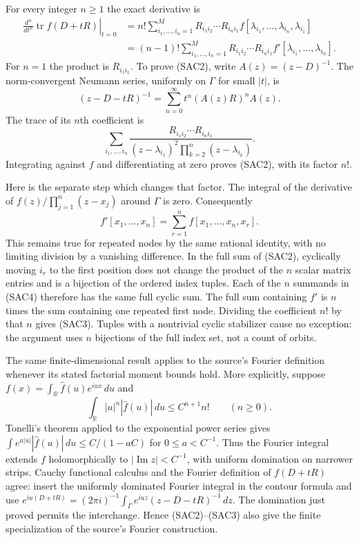 For every integer $n\geq1$ the exact derivative is
\begin{align}
 \left.\frac{d^n}{dt^n}\operatorname{tr}f(D+tR)\right|_{t=0}
 &=n!\sum_{i_1,\ldots,i_n=1}^{M}
       R_{i_1i_2}\cdots R_{i_ni_1}
       f[\lambda_{i_1},\ldots,\lambda_{i_n},\lambda_{i_1}]
       \tag{SAC2}\label{eq:SAC-repeated}\\
 &=(n-1)!\sum_{i_1,\ldots,i_n=1}^{M}
       R_{i_1i_2}\cdots R_{i_ni_1}
       f'[\lambda_{i_1},\ldots,\lambda_{i_n}].
       \tag{SAC3}\label{eq:SAC-cyclic}
\end{align}
For $n=1$ the product is $R_{i_1i_1}$. To prove (SAC2), write
$A(z)=(z-D)^{-1}$. The norm-convergent Neumann series, uniformly
on $\Gamma$ for small $|t|$, is
\[
 (z-D-tR)^{-1}
 =\sum_{n=0}^{\infty}t^n(A(z)R)^n A(z).
\]
The trace of its $n$th coefficient is
\[
 \sum_{i_1,\ldots,i_n}
 \frac{R_{i_1i_2}\cdots R_{i_ni_1}}
 {(z-\lambda_{i_1})^2
       \prod_{k=2}^n(z-\lambda_{i_k})}.
\]
Integrating against $f$ and differentiating at zero proves (SAC2),
with its factor $n!$.

Here is the separate step which changes that factor. The integral
of the derivative of $f(z)/\prod_{j=1}^{n}(z-x_j)$ around
$\Gamma$ is zero. Consequently
\begin{equation}\tag{SAC4}
 f'[x_1,\ldots,x_n]
 =\sum_{r=1}^{n} f[x_1,\ldots,x_n,x_r].
\end{equation}
This remains true for repeated nodes by the same rational identity,
with no limiting division by a vanishing difference. In the full
sum of (SAC2), cyclically moving $i_r$ to the first position does
not change the product of the $n$ scalar matrix entries and is a
bijection of the ordered index tuples. Each of the $n$ summands
in (SAC4) therefore has the same full cyclic sum. The full sum
containing $f'$ is $n$ times the sum containing one repeated first
node. Dividing the coefficient $n!$ by that $n$ gives (SAC3).
Tuples with a nontrivial cyclic stabilizer cause no exception:
the argument uses $n$ bijections of the full index set, not a
count of orbits.

The same finite-dimensional result applies to the source's
Fourier definition whenever its stated factorial moment bounds
hold. More explicitly, suppose
$f(x)=\int_{\mathbb R}\widehat f(u)e^{iux}\,du$ and
\[
 \int_{\mathbb R}|u|^n|\widehat f(u)|\,du
 \leq C^{n+1}n!\qquad(n\geq0).
\]
Tonelli's theorem applied to the exponential power series gives
$\int e^{a|u|}|\widehat f(u)|\,du\leq C/(1-aC)$ for
$0\leq a<C^{-1}$. Thus the Fourier integral extends $f$
holomorphically to $|\operatorname{Im}z|<C^{-1}$, with uniform
domination on narrower strips. Cauchy functional calculus and the
Fourier definition of $f(D+tR)$ agree: insert the uniformly
dominated Fourier integral in the contour formula and use
$e^{iu(D+tR)}=(2\pi i)^{-1}\int_\Gamma
e^{iuz}(z-D-tR)^{-1}\,dz$. The domination just proved permits
the interchange. Hence (SAC2)--(SAC3) also give the finite
specialization of the source's Fourier construction.

